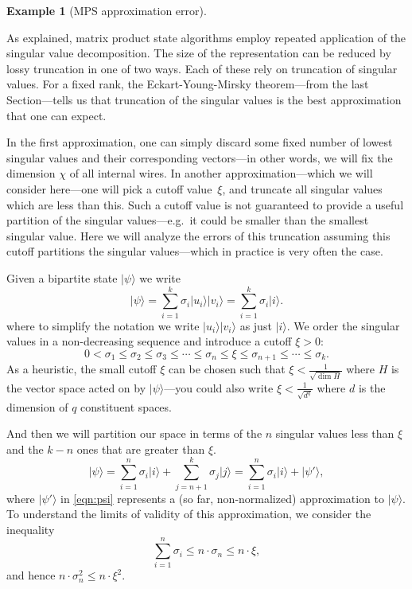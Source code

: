 \documentclass[aps,pra,12pt,nofootinbib,superscriptaddress,longbibliography]{revtex4-1}
\theoremstyle{plain}
\theoremstyle{definition}
\newtheorem{example}[theorem]{Example}
\newcommand{\ket}[1]{\mbox{$|#1\rangle$}}
\begin{document}
\begin{example}[MPS approximation error]\label{ex:approx}

As explained, matrix product state algorithms employ repeated application of the singular value decomposition.  The size of the representation can be reduced by lossy truncation in one of two ways.  Each of these rely on truncation of singular values.  For a fixed rank, the Eckart-Young-Mirsky theorem---from the last Section---tells us that truncation of the singular values is the best approximation that one can expect. 

In the first approximation, one can
simply discard some fixed number of lowest singular values and their corresponding vectors---in other words, we will fix the dimension $\chi$ of all internal wires.
In another approximation---which we will consider here---one will pick a cutoff value~$\xi$,
and truncate all singular values which are less than this.
Such a cutoff value is not guaranteed to provide a useful partition of the singular values---e.g.~it could be smaller than the smallest singular value.  
Here we will analyze the errors of this truncation assuming this cutoff partitions the singular values---which in practice is very often the case.  

Given a bipartite state $\ket{\psi}$ we write
\begin{equation}\label{eqn:svd1}
  \ket{\psi} = \sum_{i=1}^k \sigma_i \ket{u_i}\ket{v_i} = \sum_{i=1}^k \sigma_i \ket{i}.
\end{equation}
where to simplify the notation we write $\ket{u_i}\ket{v_i}$ as just $\ket{i}$.
We order the singular values in a non-decreasing sequence and introduce a cutoff $\xi > 0$:
\begin{equation}
0 < \sigma_1\leq \sigma_2\leq \sigma_3\leq\cdots \le \sigma_n\leq \xi \leq \sigma_{n+1}\leq\cdots \leq \sigma_k.
\end{equation}
As a heuristic, the small cutoff $\xi$ can be chosen such that $\xi < \frac{1}{\sqrt{\dim H}}$ where $H$ is the vector space acted on by $\ket{\psi}$---you could also write $\xi < \frac{1}{\sqrt{d^{q}}}$ where $d$ is the dimension of $q$ constituent spaces.   

And then we will partition our space in terms of the $n$ singular values less than $\xi$ and the $k-n$ ones that are greater than $\xi$. 
\begin{equation}\label{eqn:psi}
 \ket{\psi}= \sum_{i=1}^n \sigma_i \ket{i} + \sum_{j=n+1}^k \sigma_j \ket{j} = \sum_{i=1}^n \sigma_i \ket{i} + \ket{\psi'},
\end{equation}
where $\ket{\psi'}$ in \eqref{eqn:psi} represents a (so far, non-normalized) approximation to $\ket{\psi}$. To understand the limits of validity of this approximation, we consider the inequality  
\begin{equation}
\label{eq:sigma_ineq}
 \sum_{i=1}^n \sigma_i \leq  n\cdot  \sigma_n \leq n \cdot \xi,
\end{equation}
and hence $n \cdot \sigma_n^2 \leq n \cdot \xi^2$.  


\end{example}
\end{document}
